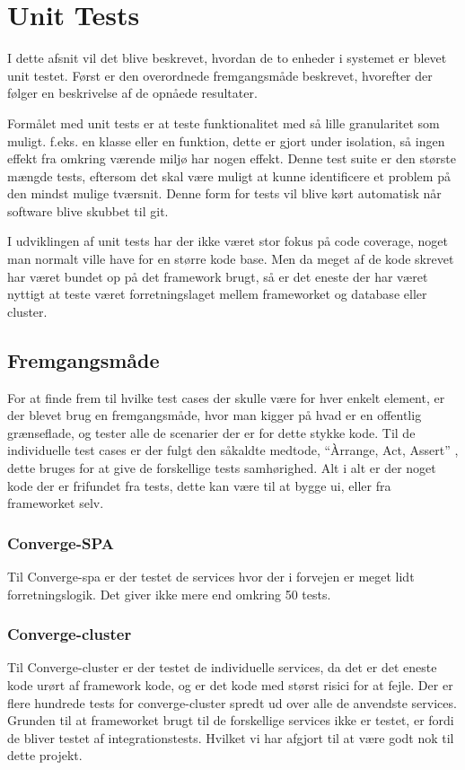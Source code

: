 
\section{Unit Tests}

I dette afsnit vil det blive beskrevet, hvordan de to enheder i systemet er blevet unit testet. Først er den overordnede fremgangsmåde beskrevet, hvorefter der følger en beskrivelse af de opnåede resultater.

Formålet med unit tests er at teste funktionalitet med så lille granularitet som muligt. f.eks. en klasse eller en funktion, dette er gjort under isolation, så ingen effekt fra omkring værende miljø har nogen effekt. Denne test suite er den største mængde tests, eftersom det skal være muligt at kunne identificere et problem på den mindst mulige tværsnit. Denne form for tests vil blive kørt automatisk når software blive skubbet til git.

I udviklingen af unit tests har der ikke været stor fokus på code coverage, noget man normalt ville have for en større kode base. Men da meget af de kode skrevet har været bundet op på det framework brugt, så er det eneste der har været nyttigt at teste været forretningslaget mellem frameworket og database eller cluster.

\subsection{Fremgangsmåde}

For at finde frem til hvilke test cases der skulle være for hver enkelt element, er der blevet brug en fremgangsmåde, hvor man kigger på hvad er en offentlig grænseflade, og tester alle de scenarier der er for dette stykke kode. Til de individuelle test cases er der fulgt den såkaldte medtode, ``Àrrange, Act, Assert'' , dette bruges for at give de forskellige tests samhørighed. Alt i alt er der noget kode der er frifundet fra tests, dette kan være til at bygge ui, eller fra frameworket selv.

\subsubsection{Converge-SPA}

Til Converge-spa er der testet de services hvor der i forvejen er meget lidt forretningslogik. Det giver ikke mere end omkring 50 tests.

\subsubsection{Converge-cluster}

Til Converge-cluster er der testet de individuelle services, da det er det eneste kode urørt af framework kode, og er det kode med størst risici for at fejle. Der er flere hundrede tests for converge-cluster spredt ud over alle de anvendste services. Grunden til at frameworket brugt til de forskellige services ikke er testet, er fordi de bliver testet af integrationstests. Hvilket vi har afgjort til at være godt nok til dette projekt.